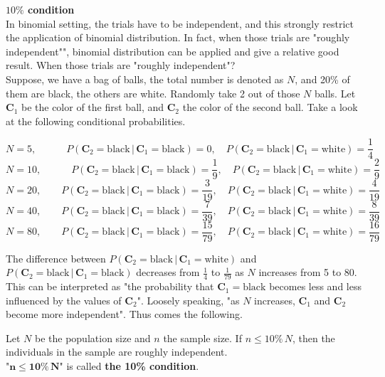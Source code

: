 \documentclass[a4paper, 12pt,twoside]{book}
\begin{document}
     
      \noindent \textbf{$10\%$ condition}\vspace{0.3cm}\\
       
       In binomial setting, the trials have to be independent, and this strongly restrict the application of binomial distribution. In fact, when those trials are "roughly independent"", binomial distribution can be applied and give a relative good result. When those trials are "roughly independent"?\vspace{0.3cm}\\
       Suppose, we have a bag of balls, the total number is denoted as $N$, and 20\% of them are black, the others are white. Randomly take 2 out of those $N$ balls. Let $\textbf{C}_1$ be the color of the first ball, and $\textbf{C}_2$ the color of the second ball. Take a look at the following conditional probabilities.
       
       $$N=5, \quad\qquad P(\textbf{C}_2 = \text{black}\,|\, \textbf{C}_1 = \text{black}) = 0, \quad P(\textbf{C}_2 = \text{black}\,|\, \textbf{C}_1 = \text{white}) = \frac{1}{4}$$       
             $$N=10, \quad\qquad P(\textbf{C}_2 = \text{black}\,|\, \textbf{C}_1 = \text{black}) = \frac{1}{9}, \quad P(\textbf{C}_2 = \text{black}\,|\, \textbf{C}_1 = \text{white}) = \frac{2}{9}$$              
              $$N=20, \qquad P(\textbf{C}_2 = \text{black}\,|\, \textbf{C}_1 = \text{black}) = \frac{3}{19}, \quad P(\textbf{C}_2 = \text{black}\,|\, \textbf{C}_1 = \text{white}) = \frac{4}{19}$$              
              $$N=40, \qquad P(\textbf{C}_2 = \text{black}\,|\, \textbf{C}_1 = \text{black}) = \frac{7}{39}, \quad P(\textbf{C}_2 = \text{black}\,|\, \textbf{C}_1 = \text{white}) = \frac{8}{39}$$             
               $$N=80, \qquad P(\textbf{C}_2 = \text{black}\,|\, \textbf{C}_1 = \text{black}) = \frac{15}{79}, \quad P(\textbf{C}_2 = \text{black}\,|\, \textbf{C}_1 = \text{white}) = \frac{16}{79}$$       
       \vspace{0.3cm}      
         
  \noindent The difference between $P(\textbf{C}_2 = \text{black}\,|\, \textbf{C}_1 = \text{white})$ and $P(\textbf{C}_2 = \text{black}\,|\, \textbf{C}_1 = \text{black})$ decreases from $\displaystyle{\frac{1}{4}}$ to $\displaystyle{\frac{1}{79}}$ as $N$ increases from 5 to 80. This can be interpreted as "the probability  that $\textbf{C}_1 = \text{black}$ becomes less and less influenced by the values of $\textbf{C}_2$". Loosely speaking, "as $N$ increases, $\textbf{C}_1$ and $\textbf{C}_2$ become more independent". Thus comes the following.\vspace{0.3cm}\\
  \colorbox{babypink}{\parbox{\textwidth}{
  Let $N$ be the population size and $n$ the sample size. If $n \leq 10\%\,N$, then the individuals in the sample are roughly independent. \vspace{0.3cm}\\
  "$\mathbf{n \leq 10\%\,N}$" is called \textbf{the 10\% condition}.
  }}
  \vspace{0.6cm}
  
\end{document}
